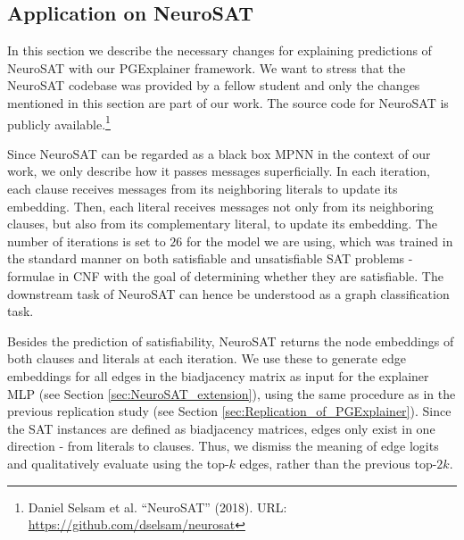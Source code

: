 \subsection{Application on NeuroSAT}
\label{sec:Application_to_NeuroSAT}

In this section we describe the necessary changes for explaining predictions of NeuroSAT \cite{selsam2018learning} with our PGExplainer framework. We want to stress that the NeuroSAT codebase was provided by a fellow student and only the changes mentioned in this section are part of our work. The source code for NeuroSAT is publicly available.\footnote{Daniel Selsam et al. “NeuroSAT” (2018). URL: \url{https://github.com/dselsam/neurosat}}

Since NeuroSAT can be regarded as a black box MPNN in the context of our work, we only describe how it passes messages superficially. In each iteration, each clause receives messages from its neighboring literals to update its embedding. Then, each literal receives messages not only from its neighboring clauses, but also from its complementary literal, to update its embedding. The number of iterations is set to $26$ for the model we are using, which was trained in the standard manner on both satisfiable and unsatisfiable SAT problems - formulae in CNF with the goal of determining whether they are satisfiable. The downstream task of NeuroSAT can hence be understood as a graph classification task.

Besides the prediction of satisfiability, NeuroSAT returns the node embeddings of both clauses and literals at each iteration. We use these to generate edge embeddings for all edges in the biadjacency matrix as input for the explainer MLP (see Section \ref{sec:NeuroSAT_extension}), using the same procedure as in the previous replication study (see Section \ref{sec:Replication_of_PGExplainer}). Since the SAT instances are defined as biadjacency matrices, edges only exist in one direction - from literals to clauses. Thus, we dismiss the meaning of edge logits and qualitatively evaluate using the top-$k$ edges, rather than the previous top-$2k$. \bigskip

